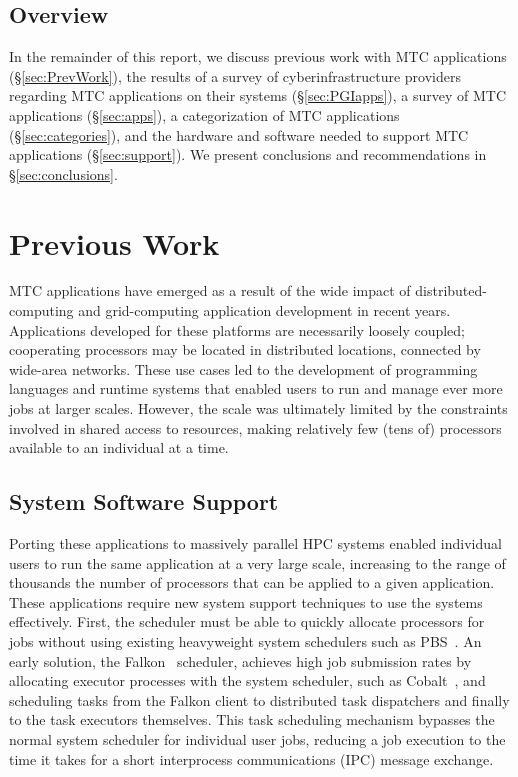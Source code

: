 \documentclass[10pt,letterpaper]{article}
\begin{document}
\subsection{Overview}

In the remainder of this report, we discuss previous work with MTC applications
(\S\ref{sec:PrevWork}), the results of a survey of cyberinfrastructure providers
regarding MTC applications on their systems (\S\ref{sec:PGIapps}), a survey
of MTC applications (\S\ref{sec:apps}), a categorization of MTC
applications (\S\ref{sec:categories}), and the hardware and software needed to
support MTC applications (\S\ref{sec:support}). We present conclusions
and recommendations in
\S\ref{sec:conclusions}.

\section{Previous Work\label{sec:PrevWork}}

MTC applications have emerged as a result of the wide impact of
distributed-computing and grid-computing application development in recent
years.  Applications developed for these platforms are necessarily
loosely coupled; cooperating processors may be located in distributed
locations, connected by wide-area networks.  These use cases led to
the development of programming languages and runtime systems that
enabled users to run and manage ever more jobs at larger scales.
However, the scale was ultimately limited by the constraints involved
in shared access to resources, making relatively few (tens of) processors
available to an individual at a time.

\subsection{System Software Support}

Porting these applications to massively parallel HPC systems enabled
individual users to run the same application at a very large scale,
increasing to the range of thousands the number of processors that can be applied to a given
application.  These applications require new
system support techniques to use the systems effectively.
First, the scheduler must be able to quickly allocate
processors for jobs without using existing heavyweight system
schedulers such as PBS~\cite{PBS_1998}.  An early solution, the
Falkon~\cite{falkon} scheduler, achieves high job submission rates by
allocating executor processes with the system scheduler, such as
Cobalt~\cite{Cobalt_WWW}, and scheduling tasks from the Falkon client
to distributed task dispatchers and finally to the task executors themselves.
This task scheduling mechanism bypasses the normal system scheduler
for individual user jobs, reducing a job execution to the time it takes for a short interprocess communications (IPC)
message exchange.
\end{document}

